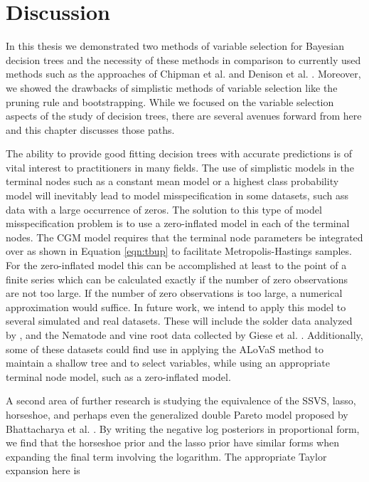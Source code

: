 \section{Discussion}
\label{ch:discuss}
 
In this thesis we demonstrated two methods of variable selection for Bayesian decision trees and the necessity of these methods in comparison to currently used methods such as  the approaches of Chipman et al. \cite{chipman1998bayesian} and Denison et al. \cite{denison1998bayesian}. Moreover, we showed the drawbacks of simplistic methods of variable selection like the pruning rule and bootstrapping. While we focused on the variable selection aspects of the study of decision trees, there are several avenues forward from here and this chapter discusses those paths. 

The ability to provide good fitting decision trees with accurate predictions is of vital interest to practitioners in many fields. The use of simplistic models in the terminal nodes such as a constant mean model or a highest class probability model will inevitably lead to model misspecification in some datasets, such ass data with a large occurrence of zeros. The solution to this type of model misspecification problem is to use a zero-inflated model in each of the terminal nodes. The CGM model requires  that the terminal node parameters be integrated over as shown in Equation \ref{eqn:tbup} to facilitate Metropolis-Hastings samples. For the zero-inflated model this can be accomplished at least to the point of a finite series which can be calculated exactly if the number of zero observations are not too large. If the number of zero observations is too large, a numerical approximation would suffice. In future work, we intend to apply this model to several simulated and real datasets. These will include the solder data analyzed by \cite{lee2006decision}, and the Nematode and vine root data collected by Giese et al. \cite{giese2014,giese2014complete}. Additionally, some of these datasets could find use in applying the ALoVaS method to maintain a shallow tree and to select variables, while using an appropriate terminal node model, such as a zero-inflated model.  

A second area of further research is studying the equivalence of the SSVS, lasso, horseshoe, and perhaps even the generalized double Pareto model proposed by Bhattacharya et al. \cite{bhattacharya2012bayesian}. By writing the negative log posteriors in proportional form, we find that the horseshoe prior and the lasso prior have similar forms when expanding the final term involving the logarithm. The appropriate Taylor expansion here is 

